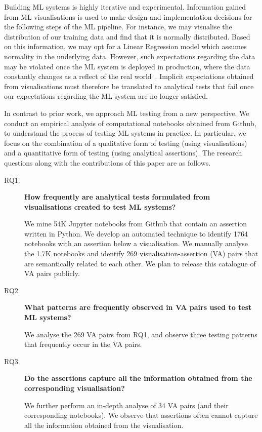 \documentclass[conference]{IEEEtran}
\begin{document}
Building ML systems is highly iterative and experimental. Information gained from ML visualisations is used to make design and implementation decisions for the following steps of the ML pipeline. For instance, we may visualise the distribution of our training data and find that it is normally distributed. Based on this information, we may opt for a Linear Regression model which assumes normality in the underlying data. However, such expectations regarding the data may be violated once the ML system is deployed in production, where the data constantly changes as a reflect of the real world~\cite{amershi2019software,sambasivan2021everyone,breck2019data,baylor2017tfx}. Implicit expectations obtained from visualisations must therefore be translated to analytical tests that fail once our expectations regarding the ML system are no longer satisfied.

In contrast to prior work, we approach ML testing from a new perspective. We conduct an empirical analysis of computational notebooks obtained from Github, to understand the process of testing ML systems in practice. In particular, we focus on the combination of a qualitative form of testing (using visualisations) and a quantitative form of testing (using analytical assertions). The research questions along with the contributions of this paper are as follows.

\begin{description}
  \item[RQ1.] \textbf{How frequently are analytical tests formulated from visualisations created to test ML systems?}

We mine 54K Jupyter notebooks from Github that contain an assertion written in Python. We develop an automated technique to identify 1764 notebooks with an assertion below a visualisation. We manually analyse the 1.7K notebooks and identify 269 visualisation-assertion (VA) pairs that are semantically related to each other. We plan to release this catalogue of VA pairs publicly.

\item[RQ2.] \textbf{What patterns are frequently observed in VA pairs used to test ML systems?}

We analyse the 269 VA pairs from RQ1, and observe three testing patterns that frequently occur in the VA pairs.

\item[RQ3.] \textbf{Do the assertions capture all the information obtained from the corresponding visualisation?}

We further perform an in-depth analyse of 34 VA pairs (and their corresponding notebooks). We observe that assertions often cannot capture all the information obtained from the visualisation.

\end{description}
\end{document}
